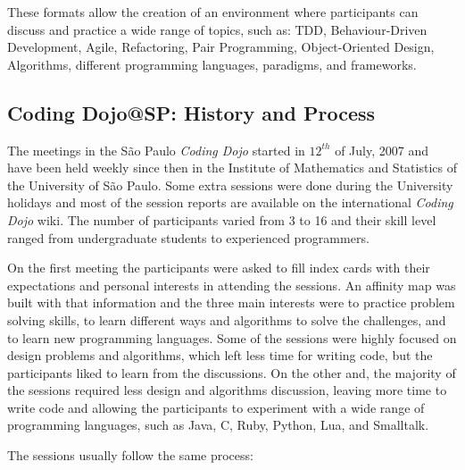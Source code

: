 These formats allow the creation of an environment where participants
can discuss and practice a wide range of topics, such as: TDD,
Behaviour-Driven Development, Agile, Refactoring, Pair Programming,
Object-Oriented Design, Algorithms, different programming languages,
paradigms, and frameworks.

\subsection{Coding Dojo@SP: History and Process}\label{subsec:dojosp}

The meetings in the São Paulo \emph{Coding Dojo} started in $12^{th}$
of July, 2007 and have been held weekly since then in the Institute of
Mathematics and Statistics of the University of São Paulo. Some extra
sessions were done during the University holidays and most of the
session reports are available on the international \emph{Coding Dojo}
wiki\cite{DojoWiki}. The number of participants varied from 3 to 16
and their skill level ranged from undergraduate students to
experienced programmers.

On the first meeting the participants were asked to fill index cards
with their expectations and personal interests in attending the
sessions. An affinity map was built with that information and the
three main interests were to practice problem solving skills, to learn
different ways and algorithms to solve the challenges, and to learn
new programming languages. Some of the sessions were highly focused on
design problems and algorithms, which left less time for writing code,
but the participants liked to learn from the discussions. On the other
and, the majority of the sessions required less design and algorithms
discussion, leaving more time to write code and allowing the
participants to experiment with a wide range of programming languages,
such as Java, C, Ruby, Python, Lua, and Smalltalk.

The sessions usually follow the same process:

